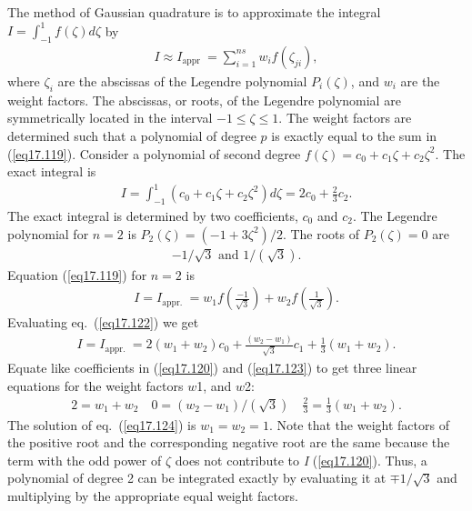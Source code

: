 \documentclass{AeroStructure-ERJohnson}
\begin{document}
The method of Gaussian quadrature is to approximate the integral $I=\int_{-1}^{1} f(\zeta) d \zeta$ by
\begin{align}\label{eq17.119}
I \approx I_{\text {appr }}=\sum_{i=1}^{n s} w_{i} f\left(\zeta_{j i}\right),
\end{align}
where $\zeta_{i}$ are the abscissas of the Legendre polynomial $P_{i}(\zeta)$, and $w_{i}$ are the weight factors. The abscissas, or roots, of the Legendre polynomial are symmetrically located in the interval $-1 \leq \zeta \leq 1$. The weight factors are determined such that a polynomial of degree $p$ is exactly equal to the sum in (\ref{eq17.119}). Consider a polynomial of second degree $f(\zeta)=c_{0}+c_{1} \zeta+c_{2} \zeta^{2}$. The exact integral is
\begin{align}\label{eq17.120}
I=\int_{-1}^{1}\left(c_{0}+c_{1} \zeta+c_{2} \zeta^{2}\right) d \zeta=2 c_{0}+\frac{2}{3} c_{2}.
\end{align}
The exact integral is determined by two coefficients, $c_0$ and $c_2$. The Legendre polynomial for $n=2$ is $P_{2}(\zeta)=\left(-1+3 \zeta^{2}\right)/2$. The roots of $P_{2}(\zeta)=0$ are
\begin{align}\label{eq17.121}
-1/\sqrt{3} \textrm{ and } 1 /(\sqrt{3}).
\end{align}
Equation (\ref{eq17.119}) for $n=2$ is
\begin{align}\label{eq17.122}
I=I_{\text {appr. }}=w_{1} f\left(\frac{-1}{\sqrt{3}}\right)+w_{2} f\left(\frac{1}{\sqrt{3}}\right).
\end{align}
Evaluating eq.~(\ref{eq17.122}) we get
\begin{align}\label{eq17.123}
I=I_{\text {appr. }}=2\left(w_{1}+w_{2}\right) c_{0}+\frac{\left(w_{2}-w_{1}\right)}{\sqrt{3}} c_{1}+\frac{1}{3}\left(w_{1}+w_{2}\right).
\end{align}
Equate like coefficients in (\ref{eq17.120}) and (\ref{eq17.123}) to get three linear equations for the weight factors $w$1, and $w$2:
\begin{align}\label{eq17.124}
2=w_{1}+w_{2} \quad 0=\left(w_{2}-w_{1}\right) /(\sqrt{3}) \quad \frac{2}{3}=\frac{1}{3}\left(w_{1}+w_{2}\right).
\end{align}
The solution of eq.~(\ref{eq17.124}) is $w_{1}=w_{2}=1$. Note that the weight factors of the positive root and the corresponding negative root are the same because the term with the odd power of $\zeta$ does not contribute to \textit{I} (\ref{eq17.120}). Thus, a polynomial of degree 2 can be integrated exactly by evaluating it at $\mp 1/\sqrt{3}$ and multiplying by the appropriate equal weight factors.
\end{document}
